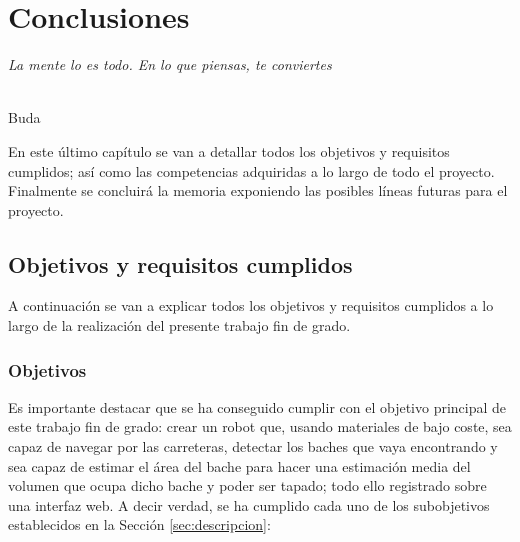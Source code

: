 \chapter{Conclusiones}
\label{cap:capitulo8}

\begin{flushright}
\begin{minipage}[]{10cm}
\emph{La mente lo es todo. En lo que piensas, te conviertes}\\
\end{minipage}\\

Buda\\
\end{flushright}

\vspace{1cm}

En este último capítulo se van a detallar todos los objetivos y requisitos cumplidos; así como las competencias adquiridas a lo largo de todo el proyecto. Finalmente se concluirá la memoria exponiendo las posibles líneas futuras para el proyecto.


\section{Objetivos y requisitos cumplidos}

A continuación se van a explicar todos los objetivos y requisitos cumplidos a lo largo de la realización del presente trabajo fin de grado. 

\subsection{Objetivos}

Es importante destacar que se ha conseguido cumplir con el objetivo principal de este trabajo fin de grado: crear un robot que, usando materiales de bajo coste, sea capaz de navegar por las carreteras, detectar los baches que vaya encontrando y sea capaz de estimar el área del bache para hacer una estimación media del volumen que ocupa dicho bache y poder ser tapado; todo ello registrado sobre una interfaz web. A decir verdad, se ha cumplido cada uno de los subobjetivos establecidos en la Sección \ref{sec:descripcion}:

